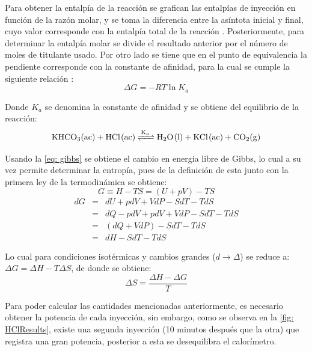 	
	
	Para obtener la entalp\'ia de la reacci\'on se grafican las entalp\'ias de inyecci\'on en funci\'on de la raz\'on molar, y se toma la diferencia entre la as\'intota inicial y final, cuyo valor corresponde con la entalp\'ia total de la reacci\'on \cite{nanoitc}. Posteriormente, para determinar la entalp\'ia molar se divide el resultado anterior por el n\'umero de moles de titulante usado. Por otro lado se tiene que en el punto de equivalencia la pendiente corresponde con la constante de afinidad, para la cual se cumple la siguiente relaci\'on \cite{matsuyama2017isothermal, velazquez2006isothermal, nanoitc}: 
	\begin{equation}\label{eq: gibbs}
		\Delta G = -RT\ln K_a
	\end{equation}
	
	Donde $K_a$ se denomina la constante de afinidad y se obtiene del equilibrio de la reacci\'on:
	\begin{equation}
		\ce{KHCO3(ac) + HCl(ac) <=>[K_a] H2O(l) + KCl(ac) + CO2(g)}
	\end{equation}
	
	Usando la \autoref{eq: gibbs} se obtiene el cambio en energ\'ia libre de Gibbs, lo cual a su vez permite determinar la entrop\'ia, pues de la definici\'on de esta junto con la primera ley de la termodin\'amica se obtiene:
	\begin{equation}
		G \equiv H - TS = (U + pV) - TS
	\end{equation}
	\begin{equation}
		\begin{matrix}
			dG & = & dU + pdV + VdP - SdT -TdS \\
			& = & dQ - pdV + pdV + VdP -SdT -TdS \\
			& = & (dQ + VdP) - SdT - TdS \\
			& = & dH - SdT - TdS
		\end{matrix}
	\end{equation}
	
	Lo cual para condiciones isot\'ermicas y cambios grandes ($d \rightarrow \Delta$) se reduce a: $\Delta G = \Delta H - T\Delta S$, de donde se obtiene:
	\begin{equation}
		\Delta S = \dfrac{\Delta H - \Delta G}{T}
	\end{equation}
	
	Para poder calcular las cantidades mencionadas anteriormente, es necesario obtener la potencia de cada inyecci\'on, sin embargo, como se observa en la \autoref{fig: HClResults}, existe una segunda inyecci\'on (10 minutos despu\'es que la otra) que registra una gran potencia, posterior a esta se desequilibra el calor\'imetro.

